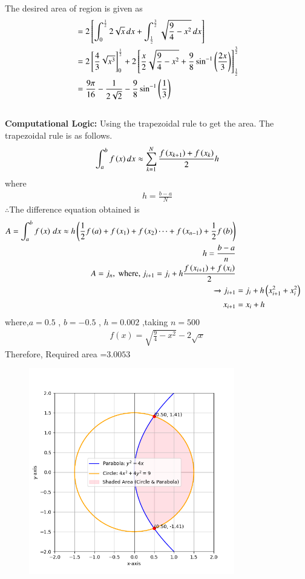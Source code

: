 \documentclass[journal]{IEEEtran}
\numberwithin{equation}{enumi}
\numberwithin{figure}{enumi}
\begin{document}
	The desired area of region is given as\\
	\begin{align*}
		&= 2{}\left[\int_{0}^{\frac{1}{2}} 2\sqrt{x} \, dx + \int_{\frac{1}{2}}^{\frac{3}{2}} \sqrt{\frac{9}{4}-x^2} \, dx\right]\\
		&= 2{}\left[\frac{4}{3}\sqrt{x^3}\right]_0^\frac{1}{2} + 2{}\left[\frac{x}{2}\sqrt{\frac{9}{4}-x^2} + \frac{9}{8}\sin^{-1}\left(\frac{2x}{3}\right)\right]_\frac{1}{2}^\frac{3}{2}\\
		&= \frac{9\pi}{16}-\frac{1}{2\sqrt{2}}-\frac{9}{8}\sin^{-1}\left(\frac{1}{3}\right)
	\end{align*}\\
	
\textbf{Computational Logic:} 
Using the trapezoidal rule to get the area. The trapezoidal rule is as follows.
\begin{align}
    \int^{b}_{a} f\left(x\right)dx\approx \sum^{N}_{k=1}\frac{f\left(x_{k+1}\right)+f\left(x_{k}\right)}{2}h
\end{align}
where
\begin{align}
    h=\frac{b-a}{N}
\end{align}
$\therefore$The difference equation obtained is\\
\begin{align}
A = \int_a^b f\left(x\right)\, dx \approx h\left(\frac{1}{2}f\left(a\right) + f\left(x_1\right) + f\left(x_2\right) \cdots + f\left(x_{n-1}\right) + \frac{1}{2}f\left(b\right)\right)\\
h = \frac{b-a}{n}\\
A = j_n, \text{ where, } j_{i + 1} = j_i + h\frac{f\left(x_{i+1}\right) + f\left(x_i\right)}{2}\\ 
\xrightarrow{} j_{i + 1} &= j_i + h\left({x_{i+1}^2}+{x_{i}^2}\right)\\
x_{i+1} &= x_i + h\\
\end{align}	
where,$a=0.5$ , $b=-0.5$ , $h=0.002$ ,taking $n=500$\\
\begin{align}
f(x) = \sqrt{\frac{9}{4} - x^2} - 2\sqrt{x}
\end{align}
Therefore, Required area =$3.0053$
	
	\begin{figure}[ht]
		\centering
		\includegraphics[width=0.8\textwidth]{figs/fig.png}
	\end{figure}
\end{document}
